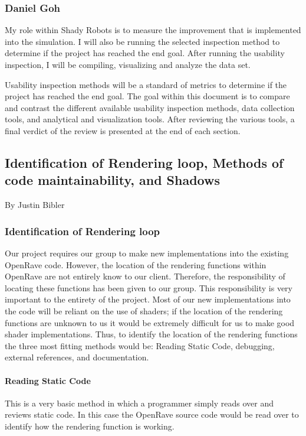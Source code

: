 \subsubsection{Daniel Goh}
My role within Shady Robots is to measure the improvement that is implemented into the simulation.
I will also be running the selected inspection method to determine if the project has reached the end goal.
After running the usability inspection, I will be compiling, visualizing and analyze the data set.

Usability inspection methods will be a standard of metrics to determine if the project has reached the end goal.
The goal within this document is to compare and contrast the different available usability inspection methods, data collection tools, and analytical and visualization tools.
After reviewing the various tools, a final verdict of the review is presented at the end of each section.

\newpage

\subsection{Identification of Rendering loop, Methods of code maintainability, and Shadows}
\large{By Justin Bibler}

\normalsize
\subsubsection{Identification of Rendering loop}
Our project requires our group to make new implementations into the existing OpenRave code.
However, the location of the rendering functions within OpenRave are not entirely know to our client.
Therefore, the responsibility of locating these functions has been given to our group.
This responsibility is very important to the entirety of the project.
Most of our new implementations into the code will be reliant on the use of shaders;
 if the location of the rendering functions are unknown to us it would be extremely difficult for us to make good shader implementations.
Thus, to identify the location of the rendering functions the three most fitting methods would be: Reading Static Code, debugging, external references, and documentation.

\paragraph{Reading Static Code}
This is a very basic method in which a programmer simply reads over and reviews static code.
In this case the OpenRave source code would be read over to identify how the rendering function is working.

